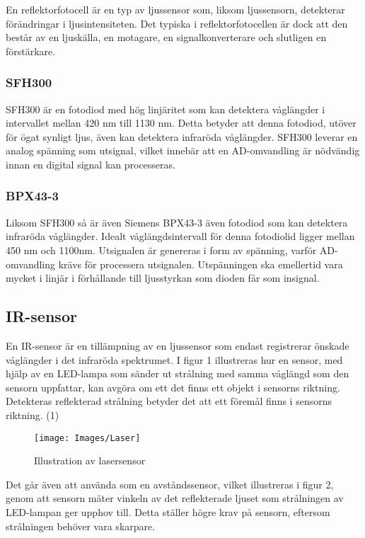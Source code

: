 \documentclass[11pt]{article}
\begin{document}
\begin{flushleft}
En reflektorfotocell är en typ av ljussensor som, liksom ljussensorn, detekterar förändringar i ljusintensiteten. Det typiska i reflektorfotocellen är dock att den  består av en ljuskälla, en motagare, en signalkonverterare och slutligen en förstärkare. \cite{website:automation}


\subsubsection{SFH300}
SFH300 är en fotodiod med hög linjäritet som kan detektera våglängder i intervallet mellan 420 nm till 1130 nm. Detta betyder att denna fotodiod, utöver för ögat synligt ljus, även kan detektera infraröda våglängder. SFH300 leverar en analog spänning som utsignal, vilket innebär att en AD-omvandling är nödvändig innan en digital signal kan processeras. \cite{Osram}


\subsubsection{BPX43-3}
Liksom SFH300 så är även Siemens BPX43-3 även fotodiod som kan detektera infraröda våglängder. Idealt våglängdsintervall för denna fotodiolid ligger mellan 450 nm och 1100nm. Utsignalen är genereras i form av spänning, varför AD-omvandling krävs för processera utsignalen. Utspänningen ska emellertid vara mycket i linjär i förhållande till ljusstyrkan som dioden får som insignal.  \cite{siemens}


\subsection{IR-sensor}
En IR-sensor är en tillämpning av en ljussensor som endast registrerar önskade våglängder i det infraröda spektrumet. I figur 1 illustreras hur en sensor, med hjälp av en LED-lampa som sänder ut strålning med samma våglängd som den sensorn uppfattar, kan avgöra om ett det finns ett objekt i sensorns riktning. Detekteras reflekterad strålning betyder det att ett föremål finns i sensorns riktning. (1)

\begin{figure}[htbp]
	\centering
	\texttt{[image: Images/Laser]}
	\caption{Illustration av lasersensor \label{Laser}}
\end{figure}

Det går även att använda som en avståndssensor, vilket illustreras i figur 2, genom att sensorn mäter vinkeln av det reflekterade ljuset som strålningen av LED-lampan ger upphov till. Detta ställer högre krav på sensorn, eftersom strålningen behöver vara skarpare.


\end{flushleft}
\end{document}
